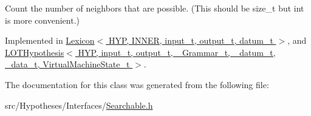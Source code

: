 Count the number of neighbors that are possible. (This should be size\+\_\+t but int is more convenient.) 



Implemented in \hyperlink{class_lexicon_a6419f323377d4c524363707eee0cae09}{Lexicon$<$ H\+Y\+P, I\+N\+N\+E\+R, input\+\_\+t, output\+\_\+t, datum\+\_\+t $>$}, and \hyperlink{class_l_o_t_hypothesis_a097cde606ec3f277fdeb92145599027f}{L\+O\+T\+Hypothesis$<$ H\+Y\+P, input\+\_\+t, output\+\_\+t, \+\_\+\+Grammar\+\_\+t, \+\_\+datum\+\_\+t, \+\_\+data\+\_\+t, Virtual\+Machine\+State\+\_\+t $>$}.



The documentation for this class was generated from the following file\+:\begin{DoxyCompactItemize}
\item 
src/\+Hypotheses/\+Interfaces/\hyperlink{_searchable_8h}{Searchable.\+h}\end{DoxyCompactItemize}
